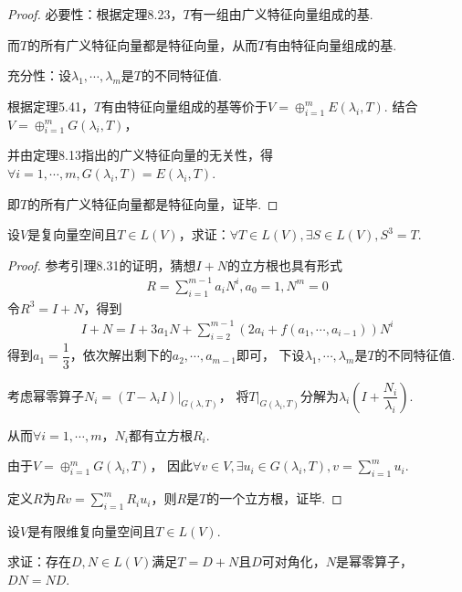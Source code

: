 \begin{proof}
    必要性：根据定理8.23，\(T\)有一组由广义特征向量组成的基.

    而\(T\)的所有广义特征向量都是特征向量，从而\(T\)有由特征向量组成的基.
    
    充分性：设\(\lambda_1,\cdots,\lambda_m\)是\(T\)的不同特征值.
    
    根据定理5.41，\(T\)有由特征向量组成的基等价于\(V=\oplus_{i=1}^m E(\lambda_i,T)\).
    结合\(V=\oplus_{i=1}^m G(\lambda_i,T)\)，
    
    并由定理8.13指出的广义特征向量的无关性，得\(\forall i=1,\cdots,m,G(\lambda_i,T)=E(\lambda_i,T)\).
    
    即\(T\)的所有广义特征向量都是特征向量，证毕.
\end{proof}

\begin{problem}[7]\label{8.B.7}
    设\(V\)是复向量空间且\(T \in L(V)\)，求证：\(\forall T \in L(V),\exists S \in L(V),S^3=T\).
\end{problem}

\begin{proof}
    参考引理8.31的证明，猜想\(I+N\)的立方根也具有形式
    \begin{align*}
        R=\sum_{i=1}^{m-1} a_iN^i,a_0=1,N^m=0
    \end{align*}
    令\(R^3=I+N\)，得到
    \begin{align*}
        I+N=I+3a_1N+\sum_{i=2}^{m-1} (2a_i+f(a_1,\cdots,a_{i-1}))N^i
    \end{align*}
    得到\(a_1=\dfrac{1}{3}\)，依次解出剩下的\(a_2,\cdots,a_{m-1}\)即可，
    下设\(\lambda_1,\cdots,\lambda_m\)是\(T\)的不同特征值.

    考虑幂零算子\(N_i=(T-\lambda_i I)|_{G(\lambda,T)}\)，
    将\(T|_{G(\lambda_i,T)}\)分解为\(\lambda_i(I+\dfrac{N_i}{\lambda_i})\).

    从而\(\forall i=1,\cdots,m\)，\(N_i\)都有立方根\(R_i\).

    由于\(V=\oplus_{i=1}^m G(\lambda_i,T)\)，
    因此\(\forall v \in V,\exists u_i \in G(\lambda_i,T),v=\sum_{i=1}^m u_i\).

    定义\(R\)为\(Rv=\sum_{i=1}^m R_iu_i\)，则\(R\)是\(T\)的一个立方根，证毕.
\end{proof}

\newpage

\begin{problem}[10]\label{8.B.10}
    设\(V\)是有限维复向量空间且\(T \in L(V)\).

    求证：存在\(D,N \in L(V)\)满足\(T=D+N\)且\(D\)可对角化，\(N\)是幂零算子，\(DN=ND\).
\end{problem}

